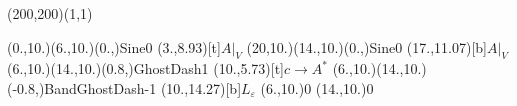 \unitlength=1bp%

\begin{feynartspicture}(200,200)(1,1)

\FADiagram{}
\FAProp(0.,10.)(6.,10.)(0.,){Sine}{0}
\FALabel(3.,8.93)[t]{$A|_V$}
\FAProp(20,10.)(14.,10.)(0.,){Sine}{0}
\FALabel(17.,11.07)[b]{$A|_V$}
\FAProp(6.,10.)(14.,10.)(0.8,){GhostDash}{1}
\FALabel(10.,5.73)[t]{$c\to A^*$}
\FAProp(6.,10.)(14.,10.)(-0.8,){BandGhostDash}{-1}
\FALabel(10.,14.27)[b]{$L_\varepsilon$}
\FAVert(6.,10.){0}
\FAVert(14.,10.){0}
\end{feynartspicture}

